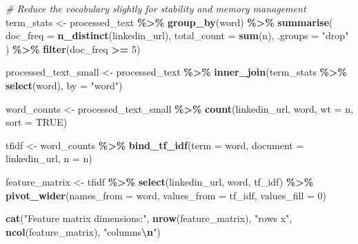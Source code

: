 \documentclass[
]{article}
\newenvironment{Shaded}{\begin{snugshade}}{\end{snugshade}}
\newcommand{\AttributeTok}[1]{\textcolor[rgb]{0.13,0.29,0.53}{#1}}
\newcommand{\CommentTok}[1]{\textcolor[rgb]{0.56,0.35,0.01}{\textit{#1}}}
\newcommand{\ConstantTok}[1]{\textcolor[rgb]{0.56,0.35,0.01}{#1}}
\newcommand{\DecValTok}[1]{\textcolor[rgb]{0.00,0.00,0.81}{#1}}
\newcommand{\FunctionTok}[1]{\textcolor[rgb]{0.13,0.29,0.53}{\textbf{#1}}}
\newcommand{\NormalTok}[1]{#1}
\newcommand{\OtherTok}[1]{\textcolor[rgb]{0.56,0.35,0.01}{#1}}
\newcommand{\SpecialCharTok}[1]{\textcolor[rgb]{0.81,0.36,0.00}{\textbf{#1}}}
\newcommand{\StringTok}[1]{\textcolor[rgb]{0.31,0.60,0.02}{#1}}
\begin{document}
\begin{Shaded}
\begin{Highlighting}[]
\CommentTok{\# Reduce the vocabulary slightly for stability and memory management}
\NormalTok{term\_stats }\OtherTok{\textless{}{-}}\NormalTok{ processed\_text }\SpecialCharTok{\%\textgreater{}\%}
  \FunctionTok{group\_by}\NormalTok{(word) }\SpecialCharTok{\%\textgreater{}\%}
  \FunctionTok{summarise}\NormalTok{(}
    \AttributeTok{doc\_freq =} \FunctionTok{n\_distinct}\NormalTok{(linkedin\_url),}
    \AttributeTok{total\_count =} \FunctionTok{sum}\NormalTok{(n),}
    \AttributeTok{.groups =} \StringTok{"drop"}
\NormalTok{  ) }\SpecialCharTok{\%\textgreater{}\%}
  \FunctionTok{filter}\NormalTok{(doc\_freq }\SpecialCharTok{\textgreater{}=} \DecValTok{5}\NormalTok{)}

\NormalTok{processed\_text\_small }\OtherTok{\textless{}{-}}\NormalTok{ processed\_text }\SpecialCharTok{\%\textgreater{}\%}
  \FunctionTok{inner\_join}\NormalTok{(term\_stats }\SpecialCharTok{\%\textgreater{}\%} \FunctionTok{select}\NormalTok{(word), }\AttributeTok{by =} \StringTok{"word"}\NormalTok{)}

\NormalTok{word\_counts }\OtherTok{\textless{}{-}}\NormalTok{ processed\_text\_small }\SpecialCharTok{\%\textgreater{}\%}
  \FunctionTok{count}\NormalTok{(linkedin\_url, word, }\AttributeTok{wt =}\NormalTok{ n, }\AttributeTok{sort =} \ConstantTok{TRUE}\NormalTok{)}

\NormalTok{tfidf }\OtherTok{\textless{}{-}}\NormalTok{ word\_counts }\SpecialCharTok{\%\textgreater{}\%}
  \FunctionTok{bind\_tf\_idf}\NormalTok{(}\AttributeTok{term =}\NormalTok{ word, }\AttributeTok{document =}\NormalTok{ linkedin\_url, }\AttributeTok{n =}\NormalTok{ n)}

\NormalTok{feature\_matrix }\OtherTok{\textless{}{-}}\NormalTok{ tfidf }\SpecialCharTok{\%\textgreater{}\%}
  \FunctionTok{select}\NormalTok{(linkedin\_url, word, tf\_idf) }\SpecialCharTok{\%\textgreater{}\%}
  \FunctionTok{pivot\_wider}\NormalTok{(}\AttributeTok{names\_from =}\NormalTok{ word, }\AttributeTok{values\_from =}\NormalTok{ tf\_idf, }\AttributeTok{values\_fill =} \DecValTok{0}\NormalTok{)}

\FunctionTok{cat}\NormalTok{(}\StringTok{"Feature matrix dimensions:"}\NormalTok{, }\FunctionTok{nrow}\NormalTok{(feature\_matrix), }\StringTok{"rows x"}\NormalTok{, }\FunctionTok{ncol}\NormalTok{(feature\_matrix), }\StringTok{"columns}\SpecialCharTok{\textbackslash{}n}\StringTok{"}\NormalTok{)}
\end{Highlighting}
\end{Shaded}
\end{document}
